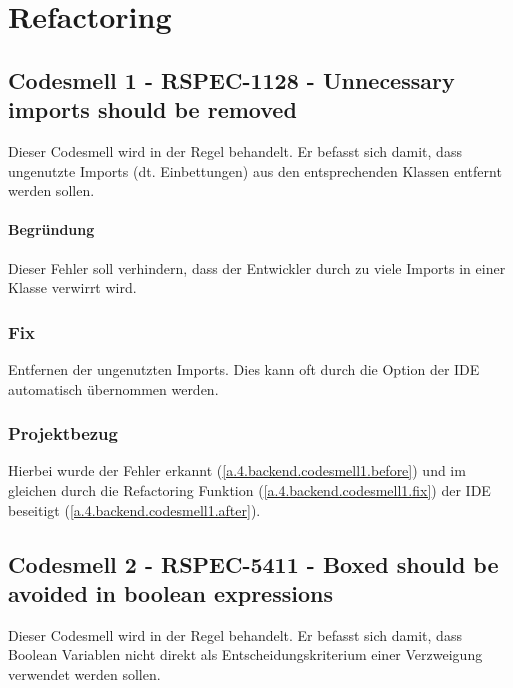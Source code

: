
\chapter{Refactoring}

	\section{Codesmell 1 - RSPEC-1128 - Unnecessary imports should be removed \cite{codeSmell1.sonar}}
	Dieser Codesmell wird in der Regel  behandelt. Er befasst sich damit, dass ungenutzte Imports (dt. Einbettungen) aus den entsprechenden Klassen entfernt werden sollen.
	\subsubsection{Begründung}
	Dieser Fehler soll verhindern, dass der Entwickler durch zu viele Imports in einer Klasse verwirrt wird.
		
		\subsection{Fix}
		Entfernen der ungenutzten Imports. Dies kann oft durch die Option  der IDE automatisch übernommen werden.
		
		\subsection{Projektbezug}
		Hierbei wurde der Fehler erkannt (\cref{a.4.backend.codesmell1.before}) und im gleichen durch die Refactoring Funktion (\cref{a.4.backend.codesmell1.fix}) der \ac{IDE} beseitigt (\cref{a.4.backend.codesmell1.after}).
		

	\section{Codesmell 2 - RSPEC-5411 - Boxed  should be avoided in boolean expressions \cite{codeSmell2.sonar}}
	Dieser Codesmell wird in der Regel  behandelt. Er befasst sich damit, dass Boolean Variablen nicht direkt als Entscheidungskriterium einer Verzweigung verwendet werden sollen.

